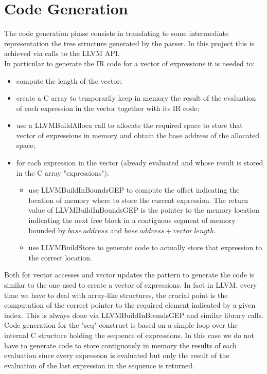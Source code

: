 \documentclass[11pt]{article}
\begin{document}
\section{Code Generation}
The code generation phase consists in translating to some intermediate representation the tree structure generated by the parser. In this project this is achieved via calls to the LLVM API.\\
In particular to generate the IR code for a vector of expressions it is needed to:
\begin{itemize}
    \item compute the length of the vector;
    \item create a C array to temporarily keep in memory the result of the evaluation of each expression in the vector together with its IR code;
    \item use a LLVMBuildAlloca call to allocate the required space to store that vector  of expressions in memory and obtain the base address of the allocated space;
    \item for each expression in the vector (already evaluated and whose result is stored in the C array "expressions"):
        \begin{itemize}
            \item use LLVMBuildInBoundsGEP to compute the offset indicating the location of memory where to store the current expression. The return value of LLVMBuildInBoundsGEP is the pointer to the memory location indicating the next free block in a contiguous segment of memory bounded by $base\ address$ and $base\ address+vector\ length$. 
            \item use LLVMBuildStore to generate code to actually store that expression to the correct location.
        \end{itemize}{}
\end{itemize}{}
Both for vector accesses and vector updates the pattern to generate the code is similar to the one used to create a vector of expressions. In fact in LLVM, every time we have to deal with array-like structures, the crucial point is the computation of the correct pointer to the required element indicated by a given index. This is always done via LLVMBuildInBoundsGEP and similar library calls.\\
Code generation for the "seq" construct is based on a simple loop over the internal C structure holding the sequence of expressions. In this case we do not have to generate code to store contiguously in memory the results of each evaluation since every expression is evaluated but only the result of the evaluation of the last expression in the sequence is returned.\\
\end{document}
